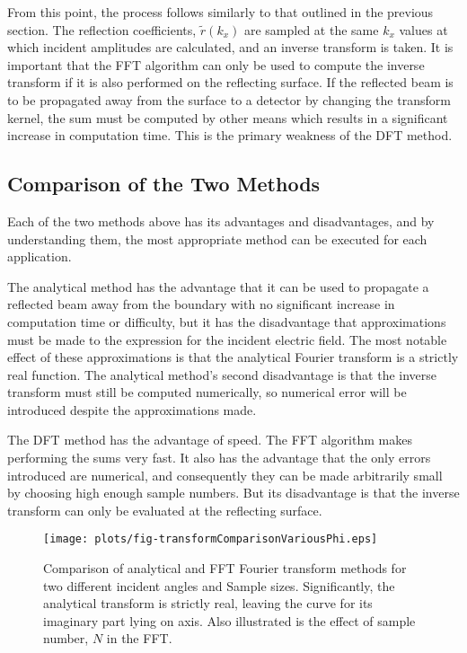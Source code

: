\documentclass[12pt]{uthesis-v12}
\begin{document}
From this point, the process follows similarly to that outlined in the previous section. The reflection coefficients, $\tilde{r}(k_x)$ are sampled at the same $k_x$ values at which incident amplitudes are calculated, and an inverse transform is taken. It is important that the FFT algorithm can only be used to compute the inverse transform if it is also performed on the reflecting surface. If the reflected beam is to be propagated away from the surface to a detector by changing the transform kernel, the sum must be computed by other means which results in a significant increase in computation time. This is the primary weakness of the DFT method.

\subsection{Comparison of the Two Methods}
Each of the two methods above has its advantages and disadvantages, and by understanding them, the most appropriate method can be executed for each application.

The analytical method has the advantage that it can be used to propagate a reflected beam away from the boundary with no significant increase in computation time or difficulty, but it has the disadvantage that approximations must be made to the expression for the incident electric field. The most notable effect of these approximations is that the analytical Fourier transform is a strictly real function. The analytical method's second disadvantage is that the inverse transform must still be computed numerically, so numerical error will be introduced despite the approximations made.

The DFT method has the advantage of speed. The FFT algorithm makes performing the sums very fast. It also has the advantage that the only errors introduced are numerical, and consequently they can be made arbitrarily small by choosing high enough sample numbers. But its disadvantage is that the inverse transform can only be evaluated at the reflecting surface.

\begin{figure}[htb]
\centering
\texttt{[image: plots/fig-transformComparisonVariousPhi.eps]}
\caption[Comparison of analytical and FFT Fourier transform methods]{Comparison of analytical and FFT Fourier transform methods for two different incident angles and Sample sizes. Significantly, the analytical transform is strictly real, leaving the curve for its imaginary part lying on axis. Also illustrated is the effect of sample number, $N$ in the FFT.
 \label{fig-transformComparisonVariousPhi}}
\end{figure}
\end{document}
